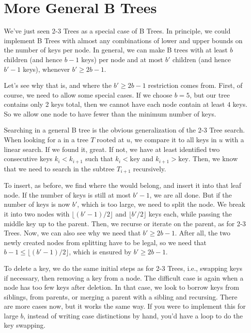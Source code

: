 \section{More General B Trees}
We've just seen 2-3 Trees as a special case of B Trees.
In principle, we could implement B Trees with almost any combinations
of lower and upper bounds on the number of keys per node. 
In general, we can make B trees with at least $b$ children (and hence
$b-1$ keys) per node and at most $b'$ children (and hence $b'-1$
keys), whenever $b' \geq 2b-1$.

Let's see why that is, and where the $b' \geq 2b-1$ restriction comes
from. First, of course, we need to allow some special cases. 
If we choose $b=5$, but our tree contains only 2 keys total, then we
cannot have each node contain at least $4$ keys. So we allow one node
to have fewer than the minimum number of keys.

Searching in a general B tree is the obvious generalization of the 2-3
Tree search. When looking for a  in a tree $T$ rooted at
$u$, we compare it to all keys in $u$ with a linear search.
If we found it, great. If not, we have at least identified two
consecutive keys $k_i < k_{i+1}$ such that $k_i < \mbox{key}$ and
$k_{i+1} > \mbox{key}$. Then, we know that we need to search in the
subtree $T_{i+1}$ recursively.

To insert, as before, we find where the  would belong, and
insert it into that leaf node. If the number of keys is still at most
$b'-1$, we are all done. But if the number of keys is now $b'$, which
is too large, we need to split the node. We break it into two nodes
with $\lfloor (b'-1)/2 \rfloor$ and $\lfloor b'/2 \rfloor$ keys each,
while passing the middle key up to the parent. Then, we recurse or
iterate on the parent, as for 2-3 Trees. Now, we can also see why we
need that $b' \geq 2b-1$. After all, the two newly created nodes from
splitting have to be legal, so we need that 
$b-1 \leq \lfloor (b'-1)/2 \rfloor$, which is ensured by $b' \geq 2b-1$.

To delete a key, we do the same initial steps as for 2-3 Trees, i.e.,
swapping keys if necessary, then removing a key from a node. 
The difficult case is again when a node has too few keys after
deletion. In that case, we look to borrow keys from siblings, from
parents, or merging a parent with a sibling and recursing.
There are more cases now, but it works the same way.
If you were to implement this for large $b$, instead of writing case
distinctions by hand, you'd have a  loop to do the key
swapping.

